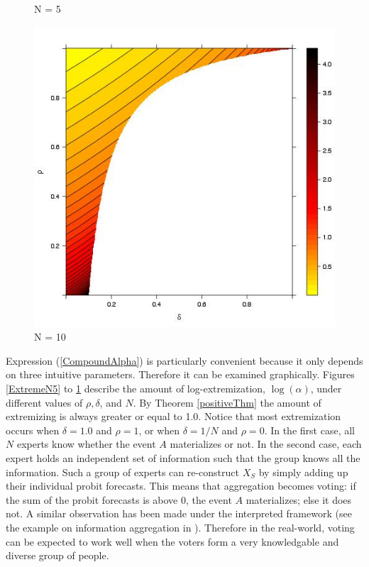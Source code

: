 \documentclass[11pt,twoside]{article}
\begin{document}
\begin{figure}[hbt!]
\begin{minipage}[t]{0.33\textwidth}
\caption{N = 5}
\label{ExtremeN10}
\end{minipage}
\begin{minipage}[t]{0.33\textwidth}
\centering
\includegraphics[width=\textwidth, height = \textwidth]{ExtremeN10.jpeg}
\caption{N = 10}
\label{ExtremeN30}
\end{minipage}
\end{figure}

Expression (\ref{CompoundAlpha}) is particularly convenient because it only depends on three intuitive parameters. Therefore it can be examined graphically. Figures \ref{ExtremeN5} to \ref{ExtremeN30} describe the amount of log-extremization, $\log(\alpha)$, under different values of $\rho, \delta$, and $N$. By Theorem \ref{positiveThm} the amount of extremizing is always greater or equal to 1.0. Notice that most extremization occurs when $\delta = 1.0$ and $\rho = 1$, or when  $\delta = 1/N$ and $\rho = 0$. In the first case, all $N$ experts know whether the event $A$ materializes or not. In the second case, each expert holds an independent set of information such that the group knows all the information. Such a group of experts can re-construct $X_S$ by simply adding up their individual probit forecasts. This means that aggregation becomes voting: if the sum of the probit forecasts is above 0, the event $A$ materializes; else it does not. A similar observation has been made under the interpreted framework (see the example on information aggregation in \cite{hong2009interpreted}). Therefore in the real-world, voting can be expected to work well when the voters form a very knowledgable and diverse group of people. 
\end{document}
